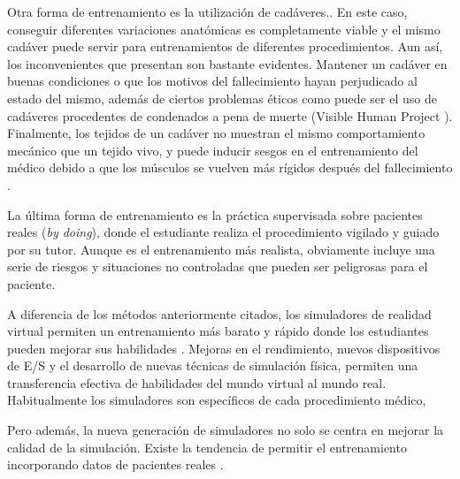 Otra forma de entrenamiento es la utilización de cadáveres\cite{Tsui2007}.. En este caso, conseguir diferentes variaciones anatómicas es completamente viable y el mismo cadáver puede servir para entrenamientos de diferentes procedimientos. Aun así, los inconvenientes que presentan son bastante evidentes. Mantener un cadáver en buenas condiciones o que los motivos del fallecimiento hayan perjudicado al estado del mismo, además de ciertos problemas éticos como puede ser el uso de cadáveres procedentes de condenados a pena de muerte (Visible Human Project \cite{ackerman1998visible}).
Finalmente, los tejidos de un cadáver no muestran el mismo comportamiento mecánico que un tejido vivo, y puede inducir sesgos en el entrenamiento del médico debido a que los músculos se vuelven más rígidos después del fallecimiento .


La última forma de entrenamiento es la práctica supervisada sobre pacientes reales (\emph{by doing}), donde el estudiante realiza el procedimiento vigilado y guiado por su tutor. Aunque es el entrenamiento más realista, obviamente incluye una serie de riesgos y situaciones no controladas que pueden ser peligrosas para el paciente.


A diferencia de los métodos anteriormente citados, los simuladores de realidad virtual permiten un entrenamiento más barato y rápido donde los estudiantes pueden mejorar sus habilidades . Mejoras en el rendimiento, nuevos dispositivos de \ac{E/S} y el desarrollo de nuevas técnicas de simulación física, permiten una transferencia efectiva de habilidades del mundo virtual al mundo real.
Habitualmente los simuladores  son específicos de cada procedimiento médico, 

Pero además, la nueva generación de simuladores no solo se centra en mejorar la calidad de la simulación. Existe la tendencia de permitir el entrenamiento incorporando datos de pacientes reales \cite{Willaert2012,  Votta2013}. 








